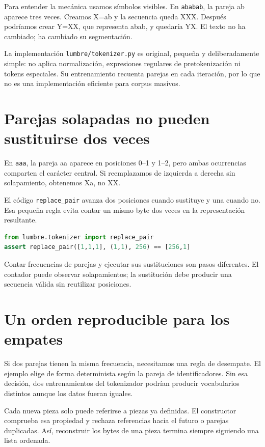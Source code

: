 \documentclass[12pt,a4paper,oneside]{report}
\begin{document}
Para entender la mecánica usamos símbolos visibles. En \texttt{ababab}, la pareja ab aparece tres veces. Creamos X=ab y la secuencia queda XXX. Después podríamos crear Y=XX, que representa abab, y quedaría YX. El texto no ha cambiado; ha cambiado su segmentación.

La implementación \texttt{lumbre/tokenizer.py} es original, pequeña y deliberadamente simple: no aplica normalización, expresiones regulares de pretokenización ni tokens especiales. Su entrenamiento recuenta parejas en cada iteración, por lo que no es una implementación eficiente para corpus masivos.

\section{Parejas solapadas no pueden sustituirse dos veces}
En \texttt{aaa}, la pareja aa aparece en posiciones 0--1 y 1--2, pero ambas ocurrencias comparten el carácter central. Si reemplazamos de izquierda a derecha sin solapamiento, obtenemos Xa, no XX.

El código \texttt{replace\_pair} avanza dos posiciones cuando sustituye y una cuando no. Esa pequeña regla evita contar un mismo byte dos veces en la representación resultante.

\begin{lstlisting}[language=Python]
from lumbre.tokenizer import replace_pair
assert replace_pair([1,1,1], (1,1), 256) == [256,1]
\end{lstlisting}
Contar frecuencias de parejas y ejecutar sus sustituciones son pasos diferentes. El contador puede observar solapamientos; la sustitución debe producir una secuencia válida sin reutilizar posiciones.

\section{Un orden reproducible para los empates}
Si dos parejas tienen la misma frecuencia, necesitamos una regla de desempate. El ejemplo elige de forma determinista según la pareja de identificadores. Sin esa decisión, dos entrenamientos del tokenizador podrían producir vocabularios distintos aunque los datos fueran iguales.

Cada nueva pieza solo puede referirse a piezas ya definidas. El constructor comprueba esa propiedad y rechaza referencias hacia el futuro o parejas duplicadas. Así, reconstruir los bytes de una pieza termina siempre siguiendo una lista ordenada.
\end{document}
